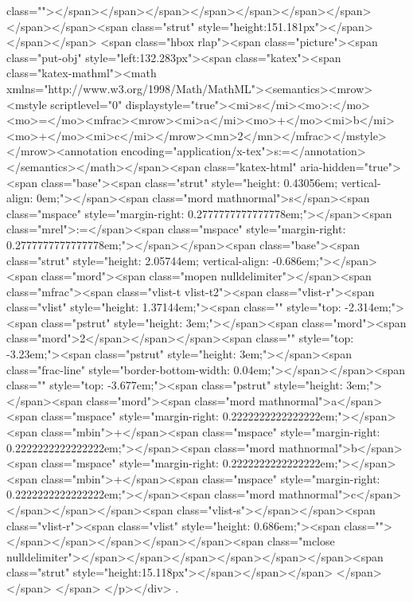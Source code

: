 class=""></span></span></span></span></span></span></span></span></span><span class="strut" style="height:151.181px"></span></span></span>
<span class="hbox rlap"><span class="picture"><span class="put-obj" style="left:132.283px"><span class="katex"><span class="katex-mathml"><math xmlns="http://www.w3.org/1998/Math/MathML"><semantics><mrow><mstyle scriptlevel="0" displaystyle="true"><mi>s</mi><mo>:</mo><mo>=</mo><mfrac><mrow><mi>a</mi><mo>+</mo><mi>b</mi><mo>+</mo><mi>c</mi></mrow><mn>2</mn></mfrac></mstyle></mrow><annotation encoding="application/x-tex">\displaystyle s:=</annotation></semantics></math></span><span class="katex-html" aria-hidden="true"><span class="base"><span class="strut" style="height: 0.43056em; vertical-align: 0em;"></span><span class="mord mathnormal">s</span><span class="mspace" style="margin-right: 0.2777777777777778em;"></span><span class="mrel">:=</span><span class="mspace" style="margin-right: 0.2777777777777778em;"></span></span><span class="base"><span class="strut" style="height: 2.05744em; vertical-align: -0.686em;"></span><span class="mord"><span class="mopen nulldelimiter"></span><span class="mfrac"><span class="vlist-t vlist-t2"><span class="vlist-r"><span class="vlist" style="height: 1.37144em;"><span class="" style="top: -2.314em;"><span class="pstrut" style="height: 3em;"></span><span class="mord"><span class="mord">2</span></span></span><span class="" style="top: -3.23em;"><span class="pstrut" style="height: 3em;"></span><span class="frac-line" style="border-bottom-width: 0.04em;"></span></span><span class="" style="top: -3.677em;"><span class="pstrut" style="height: 3em;"></span><span class="mord"><span class="mord mathnormal">a</span><span class="mspace" style="margin-right: 0.2222222222222222em;"></span><span class="mbin">+</span><span class="mspace" style="margin-right: 0.2222222222222222em;"></span><span class="mord mathnormal">b</span><span class="mspace" style="margin-right: 0.2222222222222222em;"></span><span class="mbin">+</span><span class="mspace" style="margin-right: 0.2222222222222222em;"></span><span class="mord mathnormal">c</span></span></span></span><span class="vlist-s">​</span></span><span class="vlist-r"><span class="vlist" style="height: 0.686em;"><span class=""></span></span></span></span></span><span class="mclose nulldelimiter"></span></span></span></span></span></span><span class="strut" style="height:15.118px"></span></span></span>
</span></span>​ </span>
</p></div>
.